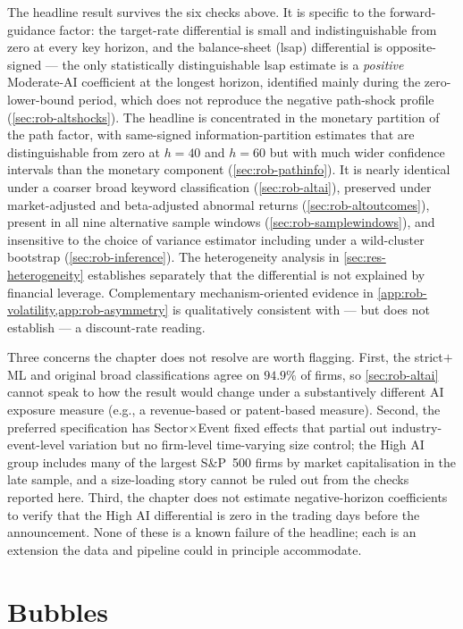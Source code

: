 The headline result survives the six checks above. It is specific
to the forward-guidance factor: the target-rate differential is
small and indistinguishable from zero at every key horizon, and
the balance-sheet (lsap) differential is opposite-signed --- the
only statistically distinguishable lsap estimate is a \emph{positive}
Moderate-AI coefficient at the longest horizon, identified mainly
during the zero-lower-bound period, which does not reproduce the
negative path-shock profile (\cref{sec:rob-altshocks}). The
headline is concentrated in the monetary partition of the path
factor, with same-signed information-partition estimates that are
distinguishable from zero at $h = 40$ and $h = 60$ but with much
wider confidence intervals than the monetary component
(\cref{sec:rob-pathinfo}). It is nearly identical under a coarser
broad keyword classification (\cref{sec:rob-altai}), preserved
under market-adjusted and beta-adjusted abnormal returns
(\cref{sec:rob-altoutcomes}), present in all nine alternative
sample windows (\cref{sec:rob-samplewindows}), and insensitive to
the choice of variance estimator including under a wild-cluster
bootstrap (\cref{sec:rob-inference}). The heterogeneity analysis in
\cref{sec:res-heterogeneity} establishes separately that the
differential is not explained by financial leverage. Complementary
mechanism-oriented evidence in
\cref{app:rob-volatility,app:rob-asymmetry} is qualitatively
consistent with --- but does not establish --- a discount-rate
reading.

Three concerns the chapter does not resolve are worth flagging.
First, the strict$+$ML and original broad classifications agree on
$94.9\%$ of firms, so \cref{sec:rob-altai} cannot speak to how the
result would change under a substantively different AI exposure
measure (e.g., a revenue-based or patent-based measure). Second, the
preferred specification has Sector$\times$Event fixed effects that
partial out industry-event-level variation but no firm-level
time-varying size control; the High AI group includes many of the
largest S\&P~500 firms by market capitalisation in the late sample,
and a size-loading story cannot be ruled out from the checks reported
here. Third, the chapter does not estimate negative-horizon
coefficients to verify that the High AI differential is zero in the
trading days before the announcement. None of these is a known
failure of the headline; each is an extension the data and pipeline
could in principle accommodate.


\section{Bubbles}

